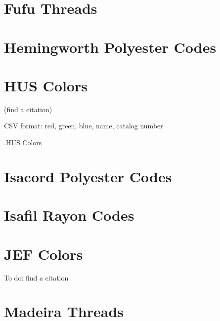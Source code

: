\documentclass[a4paper]{report}
\begin{document}
{{{{{%

\section{Fufu Threads}

%

%

\section{Hemingworth Polyester Codes}

%

\section{HUS Colors}

(find a citation)

CSV format: red, green, blue, name, catalog number

.HUS Colors

%

\section{Isacord Polyester Codes}

%

\section{Isafil Rayon Codes}

%

\section{JEF Colors}

To do: find a citation

%

\section{Madeira Threads}

%

}}}}}
\end{document}
